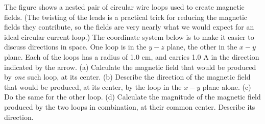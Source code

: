         The figure shows a nested pair of circular wire loops
        used to create magnetic fields. (The twisting of the leads
        is a practical trick for reducing the magnetic fields they
        contribute, so the fields are very nearly what we would
        expect for an ideal circular current loop.) The coordinate
        system below is to make it easier to discuss directions in
        space. One loop is in the $y-z$ plane, the other in the $x-y$
        plane. Each of the loops has a radius of 1.0 cm, and carries
        1.0 A in the direction indicated by the arrow.\hwendpart
        (a) Calculate
        the magnetic field that would be produced by \emph{one} such
        loop, at its center. \answercheck\hwendpart
        (b) Describe the direction of the magnetic field that would
        be produced, at its center, by the loop in the $x-y$ plane alone.\hwendpart
        (c) Do the same for the other loop.\hwendpart
        (d) Calculate the magnitude of the magnetic field produced
        by the two loops in combination, at their common center.
        Describe its direction.\answercheck
